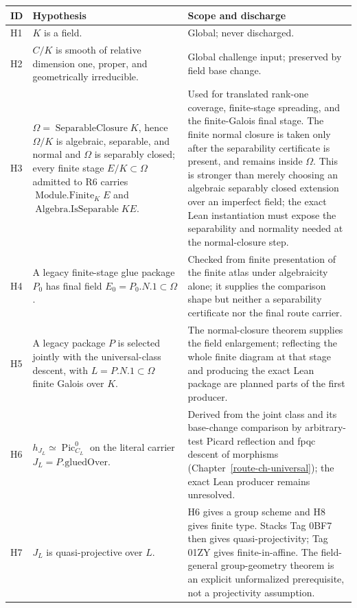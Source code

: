 \begin{center}
\begin{tabular}{p{}p{}p{}}
\textbf{ID} & \textbf{Hypothesis} & \textbf{Scope and discharge}\\ \hline
H1 & \(K\) is a field. & Global; never discharged.\\
H2 & \(C/K\) is smooth of relative dimension one, proper, and geometrically
irreducible. & Global challenge input; preserved by field base change.\\
H3 & \(\Omega=\operatorname{SeparableClosure}K\), hence \(\Omega/K\) is
algebraic, separable, and normal and \(\Omega\) is separably closed; every
finite stage \(E/K\subset\Omega\) admitted to R6 carries
\(\operatorname{Module.Finite}_K E\) and \(\operatorname{Algebra.IsSeparable} K E\). &
Used for translated rank-one coverage, finite-stage spreading, and the
finite-Galois final stage.  The finite normal closure is taken only after the
separability certificate is present, and remains inside \(\Omega\).  This is
stronger than merely choosing an algebraic separably closed extension over an
imperfect field; the exact Lean instantiation must expose the separability and
normality needed at the normal-closure step.\\
H4 & A legacy finite-stage glue package \(P_0\) has final field
\(E_0=P_0.N.1\subset\Omega\). & Checked from finite presentation of the finite
atlas under algebraicity alone; it supplies the comparison shape but neither a
separability certificate nor the final route carrier.\\
H5 & A legacy package \(P\) is selected jointly with the universal-class
descent, with \(L=P.N.1\subset\Omega\) finite Galois over \(K\). & The
normal-closure theorem supplies the field enlargement; reflecting the whole
finite diagram at that stage and producing the exact Lean package are planned
parts of the first producer.\\
H6 & \(h_{J_L}\simeq\operatorname{Pic}^0_{C_L}\) on the literal carrier
\(J_L=P.\mathrm{gluedOver}\). & Derived from the joint class and its
base-change comparison by arbitrary-test Picard reflection and fpqc descent
of morphisms (Chapter~\ref{route-ch-universal}); the exact Lean producer
remains unresolved.\\
H7 & \(J_L\) is quasi-projective over \(L\). & H6 gives a group scheme
and H8 gives finite type.  Stacks Tag 0BF7 then gives quasi-projectivity;
Tag 01ZY gives finite-in-affine.  The field-general group-geometry theorem
is an explicit unformalized prerequisite, not a projectivity assumption.\\

\end{tabular}
\end{center}
